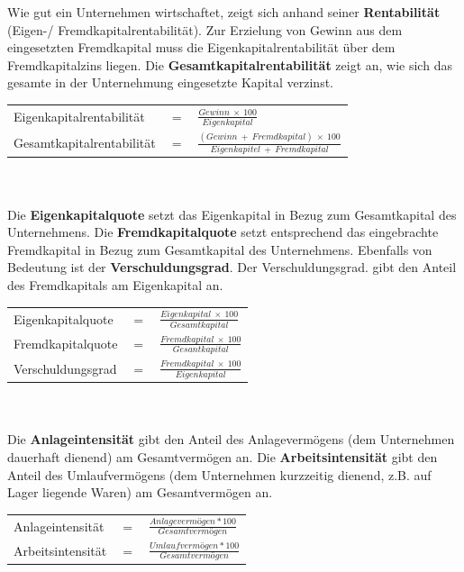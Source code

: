 Wie gut ein Unternehmen wirtschaftet, zeigt sich anhand seiner {\bf Rentabilität} (Eigen-/ Fremdkapitalrentabilität). Zur Erzielung von Gewinn aus dem eingesetzten Fremdkapital muss die Eigenkapitalrentabilität über dem Fremdkapitalzins liegen. Die {\bf Gesamtkapitalrentabilität} zeigt an, wie sich das gesamte in der Unternehmung eingesetzte Kapital verzinst.\\

\begin{tabular}{lll}
Eigenkapitalrentabilität & $=$ & $\frac{Gewinn\ \times\ 100}{Eigenkapital}$\\
Gesamtkapitalrentabilität & $=$ & $\frac{(Gewinn\ +\ Fremdkapital)\ \times\ 100}{Eigenkapitel\ +\ Fremdkapital}$	\\
\end{tabular}\\\\

Die {\bf Eigenkapitalquote} setzt das Eigenkapital in Bezug zum Gesamtkapital des Unternehmens. Die {\bf Fremdkapitalquote} setzt entsprechend das eingebrachte Fremdkapital in Bezug zum Gesamtkapital des Unternehmens. Ebenfalls von Bedeutung ist der {\bf Verschuldungsgrad}. Der Verschuldungsgrad. gibt den Anteil des Fremdkapitals am Eigenkapital an.\\

\begin{tabular}{lll}
Eigenkapitalquote & $=$ & $\frac{Eigenkapital\ \times\ 100}{Gesamtkapital}$\\
Fremdkapitalquote & $=$ & $\frac{Fremdkapital\ \times\ 100}{Gesantkapital}$\\
Verschuldungsgrad & $=$ & $\frac{Fremdkapital\ \times\ 100}{Eigenkapital}$\\
\end{tabular}\\\\

Die {\bf Anlageintensität} gibt den Anteil des Anlagevermögens (dem Unternehmen dauerhaft dienend) am Gesamtvermögen an. Die {\bf Arbeitsintensität} gibt den Anteil des Umlaufvermögens (dem Unternehmen kurzzeitig dienend, z.B. auf Lager liegende Waren) am Gesamtvermögen an.\\

\begin{tabular}{lll}
Anlageintensität & $=$ & $\frac{Anlagevermögen * 100}{Gesamtvermögen}$\\ 
Arbeitsintensität & $=$ & $\frac{Umlaufvermögen * 100}{Gesamtvermögen}$\\
\end{tabular}\\\\

